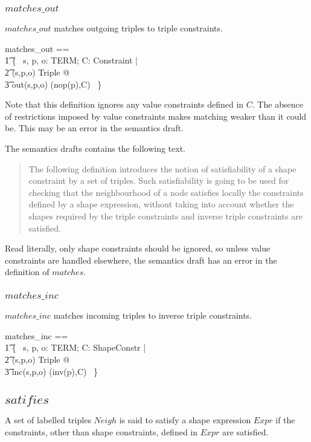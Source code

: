 \documentclass{article}
\begin{document}
\subsubsection{$matches\_out$}
$matches\_out$ matches outgoing triples to triple constraints.
\begin{zed}
	matches\_out == \\
\t1		\{~ s, p, o: TERM; C: Constraint | \\
\t2			(s,p,o) \in Triple @ \\
\t3				out(s,p,o) \mapsto (nop(p),C) ~\}
\end{zed}

Note that this definition ignores any value constraints defined in $C$.
The absence of restrictions imposed by value constraints makes matching weaker than it could be.
This may be an error in the semantics draft.

The semantics drafts contains the following text.
\begin{quote}
The following definition introduces the notion of satisfiability of a shape constraint by a set of triples. Such satisfiability is going to be used for checking that the neighbourhood of a node satisfies locally the constraints defined by a shape expression, without taking into account whether the shapes required by the triple constraints and inverse triple constraints are satisfied.
\end{quote}

Read literally, only shape constraints should be ignored, so unless value constraints are handled elsewhere, 
the semantics draft has an error in the definition of $matches$.

\subsubsection{$matches\_inc$}
$matches\_inc$ matches incoming triples to inverse triple constraints.
\begin{zed}
	matches\_inc == \\
\t1		\{~ s, p, o: TERM; C: ShapeConstr | \\
\t2			(s,p,o) \in Triple @ \\
\t3				inc(s,p,o) \mapsto (inv(p),C) ~\} 
\end{zed}

\subsection{$satifies$}
A set of labelled triples $Neigh$ is said to satisfy a shape expression $Expr$ if the constraints, other than shape constraints,
defined in $Expr$ are satisfied.
\end{document}
